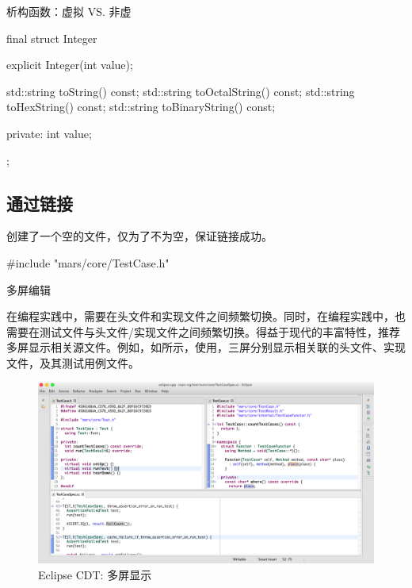 \begin{content}
\begin{episode}{析构函数：虚拟 VS. 非虚}
\begin{content}
\begin{leftbar}
 \begin{c++}
final struct Integer {
  explicit Integer(int value);

  std::string toString() const;
  std::string toOctalString() const;
  std::string toHexString() const;  
  std::string toBinaryString() const;    

private:
  int value;
};
 \end{c++}
\end{leftbar}

\end{content}

\end{episode}

\subsection{通过链接}

创建了一个空的文件，仅为了不为空，保证链接成功。

\begin{leftbar}
 \begin{c++}[caption={\ttfamily{src/mars/core/TestCase.cc}}]
#include "mars/core/TestCase.h"
 \end{c++}
\end{leftbar}


\begin{episode}{多屏编辑}

\begin{content}

在\cpp{}编程实践中，需要在头文件和实现文件之间频繁切换。同时，在编程实践中，也需要在测试文件与头文件/实现文件之间频繁切换。得益于现代的丰富特性，推荐多屏显示相关源文件。例如，如所示，使用，三屏分别显示相关联的头文件、实现文件，及其测试用例文件。

\begin{figure}[H]
\centering
\includegraphics[width=1.0\textwidth]{figures/xunit/multi-editor-eclipse.png}
\caption{Eclipse CDT: 多屏显示}
 \label{fig:multi-editor-eclipse}
\end{figure}


\end{content}
\end{episode}
\end{content}
